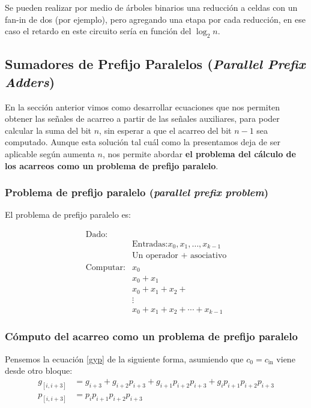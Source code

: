 Se pueden realizar por medio de árboles binarios una reducción a celdas con un fan-in de dos (por ejemplo), pero agregando una etapa por cada reducción, en ese caso el retardo en este circuito sería en función del $\log_2 n$.



\subsection{Sumadores de Prefijo Paralelos (\emph{Parallel Prefix Adders})}
En la sección anterior vimos como desarrollar ecuaciones que nos permiten obtener las señales de acarreo a partir de las señales auxiliares, para poder calcular la suma del bit $n$, sin esperar a que el acarreo del bit $n-1$ sea computado. Aunque esta solución tal cuál como la presentamos deja de ser aplicable según aumenta $n$, nos permite abordar \textbf{el problema del cálculo de los acarreos como un problema de prefijo paralelo}.
\subsubsection{Problema de prefijo paralelo (\emph{parallel prefix problem})}\label{subsec:prefixProblem}
El problema de prefijo paralelo es:

\begin{equation}
\begin{align}
\text{Dado:}\\
 & \text{Entradas:} x_0,x_1,\dotsc,x_{k-1} \\
 & \text{Un operador + asociativo}\\ 
\text{Computar}:&x_0 \nonumber \\
&x_0+x_1 \nonumber \\ 
&x_0+x_1+x_2+ \nonumber \\ 
&\vdots \nonumber \\ 
&x_0+x_1+x_2+\dotsb+x_{k-1} \nonumber
\end{align}
\end{equation}

\subsubsection{Cómputo del acarreo como un problema de prefijo paralelo}
Pensemos la ecuación \ref{gyp} de la siguiente forma, asumiendo que $c_0=c_\text{in}$ viene desde otro bloque:
\begin{equation}
\begin{align}
g_{[i,i+3]} &= g_{i+3}+g_{i+2}p_{i+3}+g_{i+1}p_{i+2}p_{i+3}+g_{i}p_{i+1}p_{i+2}p_{i+3}\nonumber\\
p_{[i,i+3]} &= p_{i}p_{i+1}p_{i+2}p_{i+3}\nonumber
\end{align}
\end{equation}

